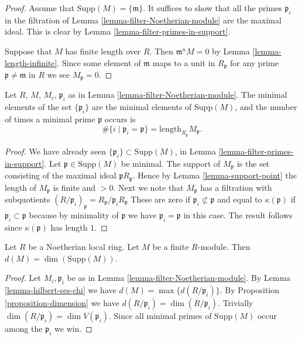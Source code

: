 \begin{proof}
Assume that $\text{Supp}(M) = \{ \mathfrak m\}$.
It suffices to show that all the primes $\mathfrak p_i$
in the filtration of Lemma \ref{lemma-filter-Noetherian-module}
are the maximal ideal. This is clear by
Lemma \ref{lemma-filter-primes-in-support}.

\medskip\noindent
Suppose that $M$ has finite length over $R$.
Then $\mathfrak m^n M = 0$ by Lemma \ref{lemma-length-infinite}.
Since some element of $\mathfrak m$ maps to a unit
in $R_{\mathfrak p}$ for any prime
$\mathfrak p \not = \mathfrak m$ in $R$ we see $M_{\mathfrak p} = 0$.
\end{proof}

\begin{lemma}
\label{lemma-filter-minimal-primes-in-support}
Let $R$, $M$, $M_i$, $\mathfrak p_i$ as in
Lemma \ref{lemma-filter-Noetherian-module}.
The minimal elements of the set $\{\mathfrak p_i\}$
are the minimal elements of $\text{Supp}(M)$, and
the number of times a minimal prime $\mathfrak p$
occurs is
$$
\#\{i \mid \mathfrak p_i = \mathfrak p\}
=
\text{length}_{R_\mathfrak p} M_{\mathfrak p}.
$$
\end{lemma}

\begin{proof}
We have already seen $\{\mathfrak p_i\} \subset \text{Supp}(M)$,
in Lemma \ref{lemma-filter-primes-in-support}.
Let $\mathfrak p \in \text{Supp}(M)$ be minimal.
The support of $M_{\mathfrak p}$ is the set
consisting of the maximal ideal $\mathfrak p R_{\mathfrak p}$.
Hence by Lemma \ref{lemma-support-point} the length
of $M_{\mathfrak p}$ is finite and $>0$. Next we
note that $M_{\mathfrak p}$ has a filtration with subquotients
$
(R/\mathfrak p_i)_{\mathfrak p}
=
R_{\mathfrak p}/{\mathfrak p_i}R_{\mathfrak p}
$
These are zero if $\mathfrak p_i \not \subset \mathfrak p$
and equal to $\kappa(\mathfrak p)$ if $\mathfrak p_i \subset
\mathfrak p$ because by minimality of $\mathfrak p$
we have $\mathfrak p_i = \mathfrak p$ in this case.
The result follows since $\kappa(\mathfrak p)$ has length $1$.
\end{proof}

\begin{lemma}
\label{lemma-support-dimension-d}
Let $R$ be a Noetherian local ring.
Let $M$ be a finite $R$-module.
Then $d(M) = \dim(\text{Supp}(M))$.
\end{lemma}

\begin{proof}
Let $M_i, \mathfrak p_i$ be as in Lemma \ref{lemma-filter-Noetherian-module}.
By Lemma \ref{lemma-hilbert-ses-chi} we have
$d(M) = \max \{ d(R/\mathfrak p_i) \}$. By
Proposition \ref{proposition-dimension} we have
$d(R/\mathfrak p_i) = \dim(R/\mathfrak p_i)$.
Trivially $\dim(R/\mathfrak p_i) = \dim V(\mathfrak p_i)$.
Since all minimal primes of $\text{Supp}(M)$ occur among
the $\mathfrak p_i$ we win.
\end{proof}











